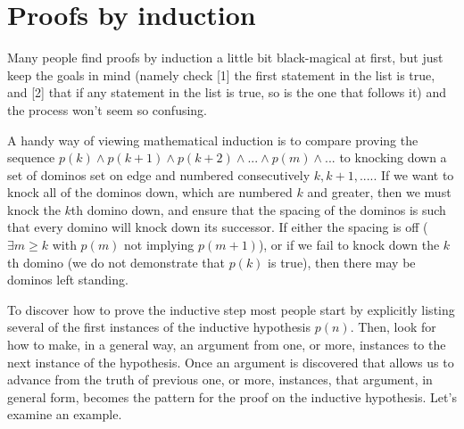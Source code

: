 \section{Proofs by induction}
Many people find proofs by induction
a little bit black{-}magical at first, but just keep the goals in mind
(namely check [1] the first statement in the list is true,
and [2] that if any statement in the list is true, so is the one that
follows it) and the process won't seem so confusing.

A handy way of viewing mathematical induction is to compare proving the sequence 
$p(k)\land p(k+1)\land p(k+2)\land ...\land p(m)\land ...$ to knocking down
a set of dominos set on edge and numbered consecutively $k,k+1,....$. If we want to knock all of the 
dominos down, which are numbered $k$ and greater, then we must knock the
$k$th domino down, and ensure that the spacing of the dominos is such that every
domino will knock down its successor. If either the spacing is off ($\exists m\geq k$
with $p(m)$ not implying $p(m+1)$), or if we fail to knock down the $k$th domino (we do not
demonstrate that $p(k)$ is true), then there may be dominos left standing.
%

To discover how to prove the inductive step most people start by explicitly listing
several of the first instances of the inductive hypothesis $p(n)$. Then, look for how
to make, in a general way, an argument from one, or more, instances to the next instance
of the hypothesis.  Once an argument is discovered that allows us to advance from the truth
of previous one, or more, instances, that argument, in general form, becomes the pattern for
the proof on  the inductive hypothesis. Let's examine an example.

